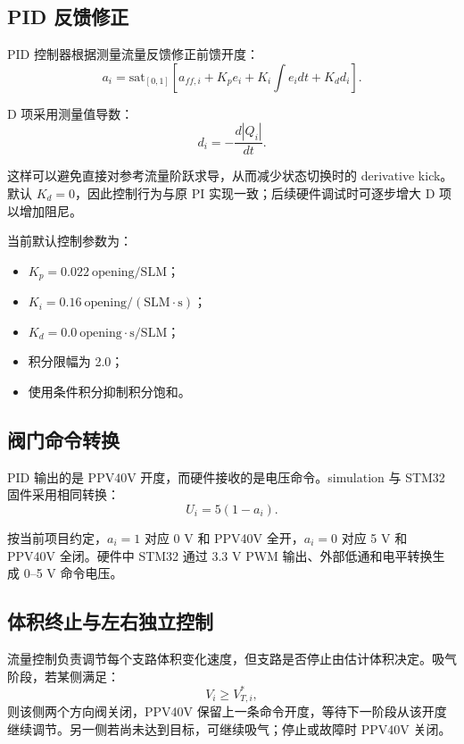 \documentclass[UTF8,11pt,a4paper]{ctexart}
\begin{document}
\subsection{PID 反馈修正}

PID 控制器根据测量流量反馈修正前馈开度：
\begin{equation}
  a_i =
  \mathrm{sat}_{[0,1]}
  \left[
    a_{ff,i}
    +K_p e_i
    +K_i\int e_i dt
    +K_d d_i
  \right].
\end{equation}

D 项采用测量值导数：
\begin{equation}
  d_i=-\frac{d|Q_i|}{dt}.
\end{equation}

这样可以避免直接对参考流量阶跃求导，从而减少状态切换时的 derivative kick。默认 $K_d=0$，因此控制行为与原 PI 实现一致；后续硬件调试时可逐步增大 D 项以增加阻尼。

当前默认控制参数为：
\begin{itemize}
  \item $K_p=0.022~\mathrm{opening/SLM}$；
  \item $K_i=0.16~\mathrm{opening/(SLM\cdot s)}$；
  \item $K_d=0.0~\mathrm{opening\cdot s/SLM}$；
  \item 积分限幅为 2.0；
  \item 使用条件积分抑制积分饱和。
\end{itemize}

\subsection{阀门命令转换}

PID 输出的是 PPV40V 开度，而硬件接收的是电压命令。simulation 与 STM32 固件采用相同转换：
\begin{equation}
  U_i=5(1-a_i).
\end{equation}

按当前项目约定，$a_i=1$ 对应 0 V 和 PPV40V 全开，$a_i=0$ 对应 5 V 和 PPV40V 全闭。硬件中 STM32 通过 3.3 V PWM 输出、外部低通和电平转换生成 0--5 V 命令电压。

\subsection{体积终止与左右独立控制}

流量控制负责调节每个支路体积变化速度，但支路是否停止由估计体积决定。吸气阶段，若某侧满足：
\begin{equation}
  V_i \geq V^*_{T,i},
\end{equation}
则该侧两个方向阀关闭，PPV40V 保留上一条命令开度，等待下一阶段从该开度继续调节。另一侧若尚未达到目标，可继续吸气；停止或故障时 PPV40V 关闭。
\end{document}

